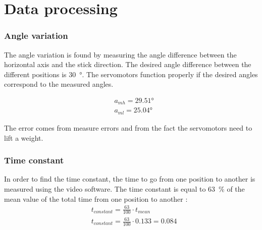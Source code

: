 	\section*{Data processing}	
	
		\subsubsection*{Angle variation}
		
The angle variation is found by measuring the angle difference between the horizontal axis and the stick direction. The desired angle difference between the different positions is \SI{30}{\degree}. The servomotors function properly if the desired angles correspond to the measured angles.

\begin{subequations}
	\begin{flalign}
		& a_{mh} = 29.51 \si{\degree} \\  
		& a_{ml} = 25.04 \si{\degree}
	\end{flalign}
\end{subequations}
\startexplain
{}
\stopexplain

The error comes from measure errors and from the fact the servomotors need to lift a weight.

		\subsubsection*{Time constant}
		
 In order to find the time constant, the time to go from one position to another is measured using the video software. The time constant is equal to \SI{63}{\percent} of the mean value of the total time from one position to another : 
 \begin{subequations}
 	\begin{flalign}
 		& t_{constant} = \frac{63}{100} \cdot t_{mean} \\
 		& t_{constant} = \frac{63}{100} \cdot 0.133 = 0.084
 		\label{eq:TfC1C2}
 	\end{flalign}
 \end{subequations}
 \startexplain
{}
\stopexplain
 
